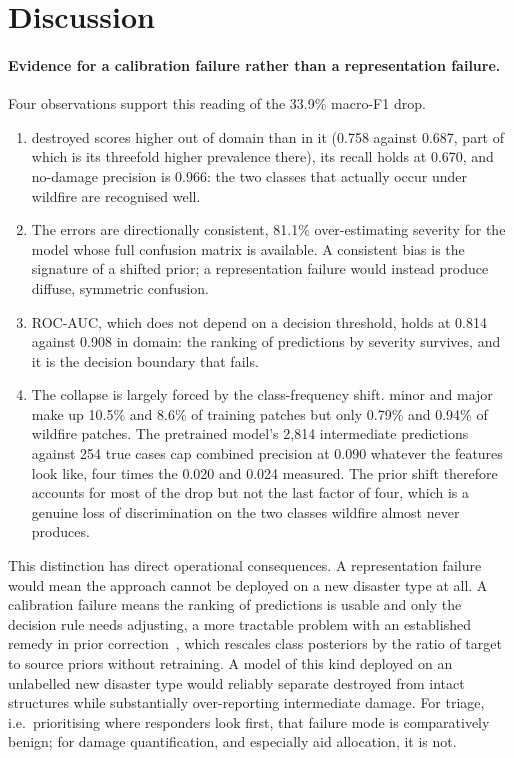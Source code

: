 \documentclass[10pt,twocolumn]{article}
\newcommand{\class}[1]{\textsf{#1}}
\begin{document}
\section{Discussion}
\label{sec:discussion}

\paragraph{Evidence for a calibration failure rather than a representation failure.} Four
observations support this reading of the 33.9\% macro-F1 drop.

\begin{enumerate}[leftmargin=*,itemsep=2pt,topsep=3pt,label=(\arabic*)]
\item \class{destroyed} scores higher out of domain than in it (0.758 against 0.687, part of which
is its threefold higher prevalence there), its recall holds at 0.670, and \class{no-damage} precision
is 0.966: the two classes that actually occur under wildfire are recognised well.
\item The errors are directionally consistent, 81.1\% over-estimating severity for the model whose
full confusion matrix is available. A consistent bias is the signature of a shifted prior; a
representation failure would instead produce diffuse, symmetric confusion.
\item ROC-AUC, which does not depend on a decision threshold, holds at 0.814 against 0.908 in
domain: the ranking of predictions by severity survives, and it is the decision boundary that fails.
\item The collapse is largely forced by the class-frequency shift. \class{minor} and
\class{major} make up 10.5\% and 8.6\% of training patches but only 0.79\% and 0.94\% of wildfire
patches. The pretrained model's 2,814 intermediate predictions against 254 true cases cap combined
precision at 0.090 whatever the features look like, four times the 0.020 and 0.024 measured. The
prior shift therefore accounts for most of the drop but not the last factor of four, which is a
genuine loss of discrimination on the two classes wildfire almost never produces.
\end{enumerate}

This distinction has direct operational consequences. A representation failure would mean the
approach cannot be deployed on a new disaster type at all. A calibration failure means the ranking of
predictions is usable and only the decision rule needs adjusting, a more tractable problem with an
established remedy in prior correction~\cite{saerens}, which rescales class posteriors by the ratio
of target to source priors without retraining. A model of this kind deployed on an unlabelled new
disaster type would reliably separate destroyed from intact structures while substantially
over-reporting intermediate damage. For triage, i.e.\ prioritising where responders look first, that
failure mode is comparatively benign; for damage quantification, and especially aid allocation, it is
not.
\end{document}

